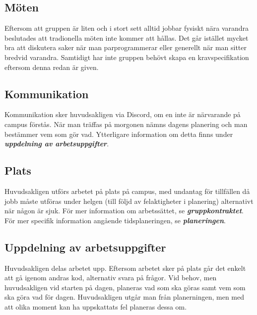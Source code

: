 \documentclass{TDP003mall}
\begin{document}
\subsection{Möten}
Eftersom att gruppen är liten och i stort sett alltid jobbar fysiskt nära varandra beslutades att tradionella möten inte kommer att hållas.
Det går istället mycket bra att diskutera saker när man parprogrammerar eller generellt när man sitter bredvid varandra. Samtidigt har inte gruppen
behövt skapa en kravspecifikation eftersom denna redan är given. 

\subsection{Kommunikation}
Kommunikation sker huvudsakligen via Discord, om en inte är närvarande på campus förstås. När man träffas på morgonen nämns dagens 
planering och man bestämmer vem som gör vad. Ytterligare information om detta finns under \textbf{\textit{uppdelning av arbetsuppgifter}}.

\subsection{Plats}
Huvudsakligen utförs arbetet på plats på campus, med undantag för tillfällen då jobb måste utföras under helgen (till följd av felaktigheter i planering)
alternativt när någon är sjuk. För mer information om arbetssättet, se \textbf{\textit{gruppkontraktet}}. För mer specifik information angående tidsplaneringen, 
se \textbf{\textit{planeringen}}. 

\subsection{Uppdelning av arbetsuppgifter}
Huvudsakligen delas arbetet upp. Eftersom arbetet sker på plats går det enkelt att gå igenom andras kod, alternativ svara på frågor. 
Vid behov, men huvudsakligen vid starten på dagen, planeras vad som ska göras samt vem som ska göra vad för dagen. Huvudsakligen utgår man från
planerningen, men med att olika moment kan ha uppskattats fel planeras dessa om. 
\end{document}
